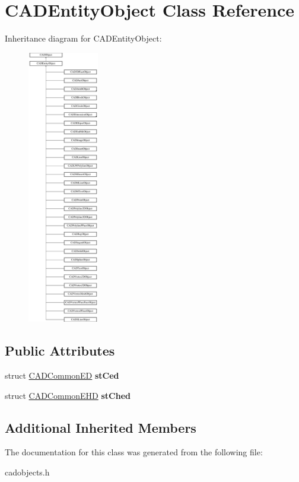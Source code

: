 \hypertarget{class_c_a_d_entity_object}{}\section{C\+A\+D\+Entity\+Object Class Reference}
\label{class_c_a_d_entity_object}
Inheritance diagram for C\+A\+D\+Entity\+Object\+:\begin{figure}[H]
\begin{center}
\leavevmode
\includegraphics[height=12.000000cm]{class_c_a_d_entity_object}
\end{center}
\end{figure}
\subsection*{Public Attributes}
\begin{DoxyCompactItemize}
\item 
struct \hyperlink{struct_c_a_d_common_e_d}{C\+A\+D\+Common\+ED} {\bfseries st\+Ced}\hypertarget{class_c_a_d_entity_object_a66c5148109d5008278079b2c9d4e10b5}{}\label{class_c_a_d_entity_object_a66c5148109d5008278079b2c9d4e10b5}

\item 
struct \hyperlink{struct_c_a_d_common_e_h_d}{C\+A\+D\+Common\+E\+HD} {\bfseries st\+Ched}\hypertarget{class_c_a_d_entity_object_a9511816e79ca3c030f28e0ea91bc36fa}{}\label{class_c_a_d_entity_object_a9511816e79ca3c030f28e0ea91bc36fa}

\end{DoxyCompactItemize}
\subsection*{Additional Inherited Members}


The documentation for this class was generated from the following file\+:\begin{DoxyCompactItemize}
\item 
cadobjects.\+h\end{DoxyCompactItemize}

